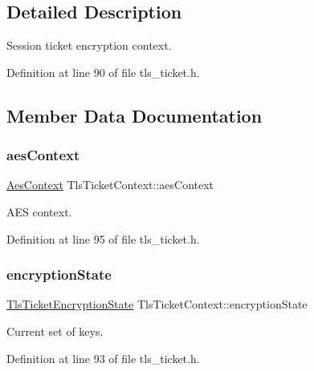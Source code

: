 \subsection{Detailed Description}
Session ticket encryption context. 

Definition at line 90 of file tls\+\_\+ticket.\+h.



\subsection{Member Data Documentation}
\mbox{\label{structTlsTicketContext_a79e7955202ca564487149653daf99272}} 
\subsubsection{\texorpdfstring{aes\+Context}{aesContext}}
{\footnotesize\ttfamily \hyperlink{structAesContext}{Aes\+Context} Tls\+Ticket\+Context\+::aes\+Context}



A\+ES context. 



Definition at line 95 of file tls\+\_\+ticket.\+h.

\mbox{\label{structTlsTicketContext_a17718f312fa71bf90c3b046e44bf160e}} 
\subsubsection{\texorpdfstring{encryption\+State}{encryptionState}}
{\footnotesize\ttfamily \hyperlink{structTlsTicketEncryptionState}{Tls\+Ticket\+Encryption\+State} Tls\+Ticket\+Context\+::encryption\+State}



Current set of keys. 



Definition at line 93 of file tls\+\_\+ticket.\+h.

\mbox{\label{structTlsTicketContext_a9dccce1f6388c835956bf82a3f4c0d3c}} 
